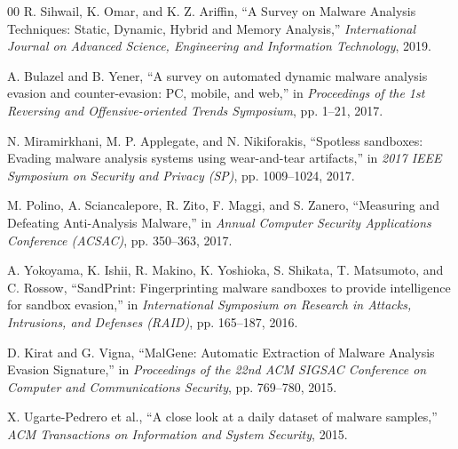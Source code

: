 \documentclass{ieeeaccess}
\begin{document}
\begin{thebibliography}{00}
 R. Sihwail, K. Omar, and K. Z. Ariffin, ``A Survey on Malware Analysis Techniques: Static, Dynamic, Hybrid and Memory Analysis,'' \textit{International Journal on Advanced Science, Engineering and Information Technology}, 2019.

 A. Bulazel and B. Yener, ``A survey on automated dynamic malware analysis evasion and counter-evasion: PC, mobile, and web,'' in \textit{Proceedings of the 1st Reversing and Offensive-oriented Trends Symposium}, pp. 1--21, 2017.

 N. Miramirkhani, M. P. Applegate, and N. Nikiforakis, ``Spotless sandboxes: Evading malware analysis systems using wear-and-tear artifacts,'' in \textit{2017 IEEE Symposium on Security and Privacy (SP)}, pp. 1009--1024, 2017.

 M. Polino, A. Sciancalepore, R. Zito, F. Maggi, and S. Zanero, ``Measuring and Defeating Anti-Analysis Malware,'' in \textit{Annual Computer Security Applications Conference (ACSAC)}, pp. 350--363, 2017.

 A. Yokoyama, K. Ishii, R. Makino, K. Yoshioka, S. Shikata, T. Matsumoto, and C. Rossow, ``SandPrint: Fingerprinting malware sandboxes to provide intelligence for sandbox evasion,'' in \textit{International Symposium on Research in Attacks, Intrusions, and Defenses (RAID)}, pp. 165--187, 2016.

 D. Kirat and G. Vigna, ``MalGene: Automatic Extraction of Malware Analysis Evasion Signature,'' in \textit{Proceedings of the 22nd ACM SIGSAC Conference on Computer and Communications Security}, pp. 769--780, 2015.

 X. Ugarte-Pedrero et al., ``A close look at a daily dataset of malware samples,'' \textit{ACM Transactions on Information and System Security}, 2015.

\end{thebibliography}
\end{document}
